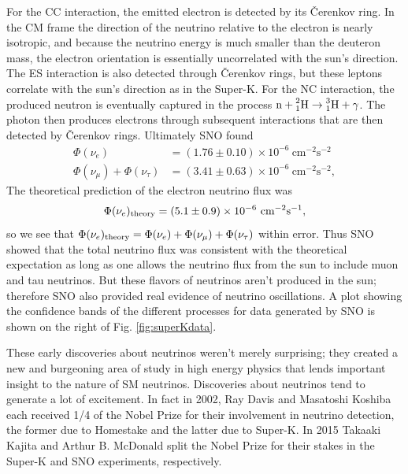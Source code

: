 For the CC interaction, the
emitted electron is detected by its \v{C}erenkov ring. In the CM frame
the direction of the neutrino relative to the electron is nearly isotropic, and
because the neutrino energy is much smaller than the deuteron mass, the
electron orientation is essentially uncorrelated with the sun's direction.
The ES interaction is also detected through \v{C}erenkov rings, but these
leptons correlate with the sun's direction as in the Super-K. For the NC
interaction, the produced neutron is eventually captured in the process
$\text{n}+\prescript{2}{1}{\text{H}}\to\prescript{3}{1}{\text{H}}+\gamma$.
The photon then produces electrons through subsequent interactions that are
then detected by \v{C}erenkov rings. Ultimately SNO found
\begin{equation}
  \begin{aligned}
    \Phi(\nu_e)&=(1.76\pm0.10)\times10^{-6}~\text{cm}^{-2}\text{s}^{-2} \\
    \Phi(\nu_\mu)+\Phi(\nu_\tau)
               &=(3.41\pm0.63)\times10^{-6}~\text{cm}^{-2}\text{s}^{-2},
  \end{aligned}
\end{equation}
The theoretical prediction of the electron neutrino flux was
\begin{equation}
  \Phi(\nu_e)_{\rm theory}
    =(5.1\pm0.9)\times10^{-6}~\text{cm}^{-2}\text{s}^{-1}, 
\end{equation}
so we see that 
$\Phi(\nu_e)_{\rm theory}=\Phi(\nu_e)+\Phi(\nu_\mu)+\Phi(\nu_\tau)$
within error. Thus SNO showed that the total
neutrino flux was consistent with the theoretical expectation as long as
one allows the neutrino flux from the sun to include muon and tau neutrinos.
But these flavors of neutrinos aren't produced in the sun; therefore SNO also
provided real evidence of neutrino oscillations.
A plot showing the confidence bands of the different processes for data
generated by SNO is shown on the right of Fig. \ref{fig:superKdata}.

These early discoveries about neutrinos weren't merely surprising; they
created a new and burgeoning area of study in high energy physics
that lends important
insight to the nature of SM neutrinos. Discoveries about neutrinos tend
to generate a lot of excitement.
In fact in 2002, Ray Davis and Masatoshi Koshiba each received 1/4 of
the Nobel Prize for their involvement in neutrino detection, the former
due to Homestake and the latter due to Super-K. In 2015 
Takaaki Kajita and Arthur B. McDonald split the Nobel Prize for their
stakes in the Super-K and SNO experiments, respectively.

